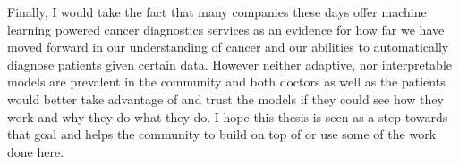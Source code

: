 Finally, I would take the fact that many companies these days offer machine
learning powered cancer diagnostics services as an evidence for how far we have
moved forward in our understanding of cancer and our abilities to automatically
diagnose patients given certain data. However neither adaptive, nor
interpretable models are prevalent in the community and both doctors as well as
the patients would better take advantage of and trust the models if they could
see how they work and why they do what they do. I hope this thesis is seen as a
step towards that goal and helps the community to build on top of or use some
of the work done here.
